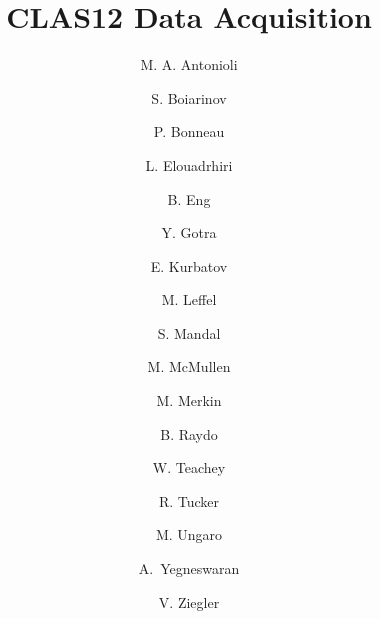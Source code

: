 \title{CLAS12 Data Acquisition}

\author[A]{M. A. Antonioli}
\author[A]{S. Boiarinov}
\author[A]{P. Bonneau}
\author[A]{L. Elouadrhiri}
\author[A]{B. Eng}
\author[A]{Y. Gotra}
\author[B]{E. Kurbatov}
\author[A]{M. Leffel}
\author[A]{S. Mandal}
\author[A]{M. McMullen}
\author[B]{M. Merkin}
\author[A]{B. Raydo}
\author[A]{W. Teachey}
\author[C]{R. Tucker}
\author[A]{M. Ungaro}
\author[A]{A.~Yegneswaran}
\author[A]{V. Ziegler}

\address[A]{Thomas Jefferson National Accelerator Facility, Newport News, VA, USA}
\address[B]{Skobeltsyn Institute of Nuclear Physics, Moscow State University, Moscow, Russia}
\address[C]{Arizona State University, Tempe, AZ}
